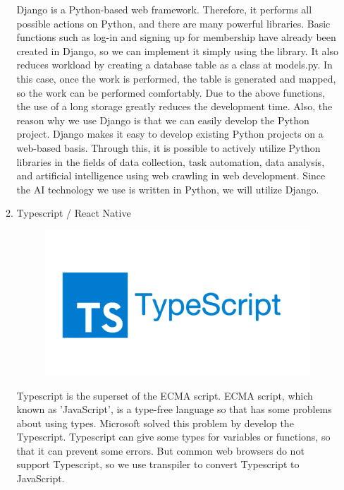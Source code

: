 \documentclass[conference]{IEEEtran}
\begin{document}
\begin{enumerate}
\begin{enumerate}
\begin{figure}[H]
         \end{figure}
        Django is a Python-based web framework. Therefore, it performs all possible actions on Python, and there are many powerful libraries. Basic functions such as log-in and signing up for membership have already been created in Django, so we can implement it simply using the library. It also reduces workload by creating a database table as a class at models.py. In this case, once the work is performed, the table is generated and mapped, so the work can be performed comfortably. Due to the above functions, the use of a long storage greatly reduces the development time. Also, the reason why we use Django is that we can easily develop the Python project. Django makes it easy to develop existing Python projects on a web-based basis. Through this, it is possible to actively utilize Python libraries in the fields of data collection, task automation, data analysis, and artificial intelligence using web crawling in web development. Since the AI technology we use is written in Python, we will utilize Django.
        \newline
        \item Typescript / React Native
        \begin{figure}[H]
         \centering
         \includegraphics[scale=0.2]{new_assets/typescript-logo.png}
         \end{figure}
        Typescript is the superset of the ECMA script. ECMA script, which known as 'JavaScript', is a type-free language so that has some problems about using types. Microsoft solved this problem by develop the Typescript. Typescript can give some types for variables or functions, so that it can prevent some errors. But common web browsers do not support Typescript, so we use transpiler to convert Typescript to JavaScript. \hfill \break
        \begin{figure}[H]

\end{figure}
\end{enumerate}
\end{enumerate}
\end{document}
